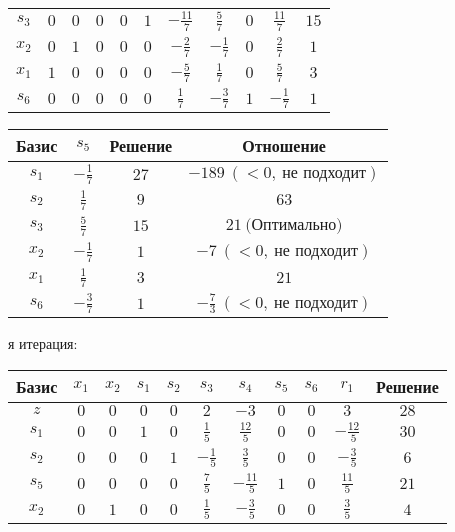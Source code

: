 \documentclass{article}%
\begin{document}
\begin{flushleft}
\begin{tabular}{|c|ccccccccc|c|}
$s_{3}$&$0$&$0$&$0$&$0$&$1$&$-\frac{11}{7}$&$\frac{5}{7}$&$0$&$\frac{11}{7}$&$15$\\%
$x_{2}$&$0$&$1$&$0$&$0$&$0$&$-\frac{2}{7}$&$-\frac{1}{7}$&$0$&$\frac{2}{7}$&$1$\\%
$x_{1}$&$1$&$0$&$0$&$0$&$0$&$-\frac{5}{7}$&$\frac{1}{7}$&$0$&$\frac{5}{7}$&$3$\\%
$s_{6}$&$0$&$0$&$0$&$0$&$0$&$\frac{1}{7}$&$-\frac{3}{7}$&$1$&$-\frac{1}{7}$&$1$\\%
\hline%
\end{tabular}%
\newline%
\newline%
\newline%
\begin{tabular}{|cccc|}%
\hline%
Базис&$s_{5}$&Решение&Отношение\\%
\hline%
$s_{1}$&$-\frac{1}{7}$&$27$&$-189\: (< 0, \: \text{не подходит})$\\%
$s_{2}$&$\frac{1}{7}$&$9$&$63$\\%
$s_{3}$&$\frac{5}{7}$&$15$&$21\: \text{(Оптимально)}$\\%
$x_{2}$&$-\frac{1}{7}$&$1$&$-7\: (< 0, \: \text{не подходит})$\\%
$x_{1}$&$\frac{1}{7}$&$3$&$21$\\%
$s_{6}$&$-\frac{3}{7}$&$1$&$-\frac{7}{3}\: (< 0, \: \text{не подходит})$\\%
\hline%
\end{tabular}%
\newline%
\newline%
я итерация: %
\newline%
\newline%
\renewcommand{\arraystretch}{1.3}%
\begin{tabular}{|c|ccccccccc|c|}%
\hline%
Базис&$x_{1}$&$x_{2}$&$s_{1}$&$s_{2}$&$s_{3}$&$s_{4}$&$s_{5}$&$s_{6}$&$r_{1}$&Решение\\%
\hline%
$z$&$0$&$0$&$0$&$0$&$2$&$-3$&$0$&$0$&$3$&$28$\\%
\hline%
$s_{1}$&$0$&$0$&$1$&$0$&$\frac{1}{5}$&$\frac{12}{5}$&$0$&$0$&$-\frac{12}{5}$&$30$\\%
$s_{2}$&$0$&$0$&$0$&$1$&$-\frac{1}{5}$&$\frac{3}{5}$&$0$&$0$&$-\frac{3}{5}$&$6$\\%
$s_{5}$&$0$&$0$&$0$&$0$&$\frac{7}{5}$&$-\frac{11}{5}$&$1$&$0$&$\frac{11}{5}$&$21$\\%
$x_{2}$&$0$&$1$&$0$&$0$&$\frac{1}{5}$&$-\frac{3}{5}$&$0$&$0$&$\frac{3}{5}$&$4$\\%

\end{tabular}
\end{flushleft}
\end{document}
